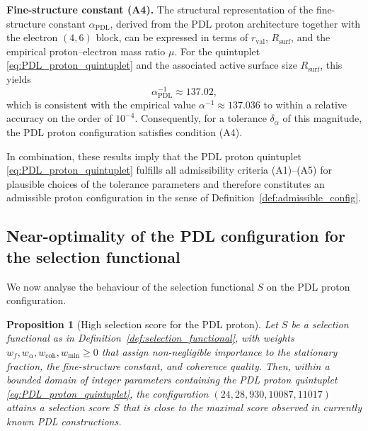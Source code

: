 \documentclass[11pt,a4paper]{article}
\newtheorem{proposition}[theorem]{Proposition}
\theoremstyle{definition}
\newcommand{\PDL}{\mathrm{PDL}}
\begin{document}
\medskip
\noindent\textbf{Fine-structure constant (A4).} The structural representation of the fine-structure constant $\alpha_{\PDL}$, derived from the PDL proton architecture together with the electron $(4,6)$ block, can be expressed in terms of $r_{\mathrm{val}}$, $R_{\mathrm{surf}}$, and the empirical proton–electron mass ratio $\mu$.\cite{Alpha_PDL_v2_2026} For the quintuplet \eqref{eq:PDL_proton_quintuplet} and the associated active surface size $R_{\mathrm{surf}}$, this yields
\[
 \alpha_{\PDL}^{-1} \approx 137.02,
\]
which is consistent with the empirical value $\alpha^{-1} \approx 137.036$ to within a relative accuracy on the order of $10^{-4}$.\cite{Alpha_PDL_v2_2026,PDL_Global_Mapping_2026} Consequently, for a tolerance $\delta_{\alpha}$ of this magnitude, the PDL proton configuration satisfies condition (A4).

In combination, these results imply that the PDL proton quintuplet \eqref{eq:PDL_proton_quintuplet} fulfills all admissibility criteria (A1)–(A5) for plausible choices of the tolerance parameters and therefore constitutes an admissible proton configuration in the sense of Definition~\ref{def:admissible_config}.\cite{Combinatorial_Proton_v2_2026,PDL_Global_Mapping_2026}

\subsection{Near-optimality of the PDL configuration for the selection functional}

We now analyse the behaviour of the selection functional $S$ on the PDL proton configuration.

\begin{proposition}[High selection score for the PDL proton]
\label{prop:high_S_PDL}
Let $S$ be a selection functional as in Definition~\ref{def:selection_functional}, with weights $w_f, w_{\alpha}, w_{\mathrm{coh}}, w_{\mathrm{min}}\geq 0$ that assign non-negligible importance to the stationary fraction, the fine-structure constant, and coherence quality. Then, within a bounded domain of integer parameters containing the PDL proton quintuplet \eqref{eq:PDL_proton_quintuplet}, the configuration $(24,28,930,10087,11017)$ attains a selection score $S$ that is close to the maximal score observed in currently known PDL constructions.\cite{Combinatorial_Proton_v2_2026,PDL_Global_Mapping_2026}
\end{proposition}
\end{document}
